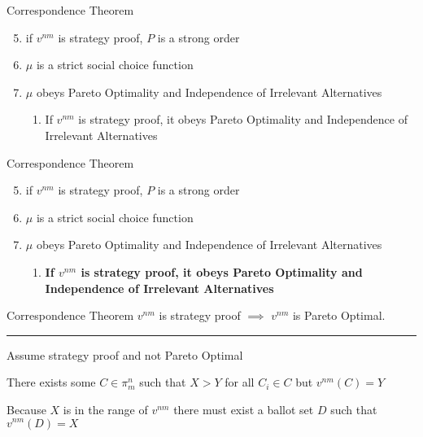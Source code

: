 \documentclass{beamer}
\begin{document}
\begin{frame}{Correspondence Theorem}

\begin{enumerate}
    \setcounter{enumi}{4}
    \item if $v^{nm}$ is strategy proof, $P$ is a strong order
    \item $\mu$ is a strict social choice function
    \item $\mu$ obeys Pareto Optimality and Independence of Irrelevant Alternatives
    \begin{enumerate}
        \item If $v^{nm}$ is strategy proof, it obeys Pareto Optimality and Independence of Irrelevant Alternatives
    \end{enumerate}
\end{enumerate}
\end{frame}

\begin{frame}{Correspondence Theorem}
\begin{enumerate}
    \setcounter{enumi}{4}
    \item if $v^{nm}$ is strategy proof, $P$ is a strong order
    \item $\mu$ is a strict social choice function
    \item $\mu$ obeys Pareto Optimality and Independence of Irrelevant Alternatives
    \begin{enumerate}
        \item \textbf{If $v^{nm}$ is strategy proof, it obeys Pareto Optimality and Independence of Irrelevant Alternatives}
    \end{enumerate}
\end{enumerate}
\end{frame}

\begin{frame}{Correspondence Theorem}
    $v^{nm}$ is strategy proof $\implies$ $v^{nm}$ is Pareto Optimal.

\noindent\rule{9cm}{0.4pt}

\vskip 0.25cm

    Assume strategy proof and not Pareto Optimal

\vskip 0.25cm

    There exists some $C \in \pi_m^n$ such that $X > Y$ for all $C_i \in C$ but $v^{nm}(C) = Y$

\vskip 0.25cm

    Because $X$ is in the range of $v^{nm}$ there must exist a ballot set $D$ such that $v^{nm}(D) = X$ 

\end{frame}
\end{document}
